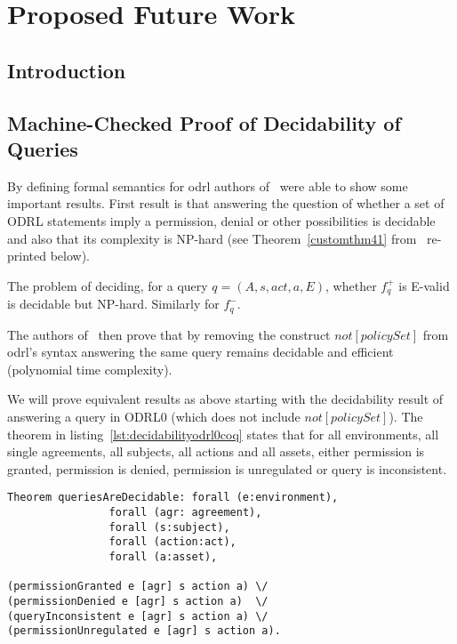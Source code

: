 \chapter{Proposed Future Work}

\section{Introduction}


\section{Machine-Checked Proof of Decidability of Queries}

By defining formal semantics for \ac{odrl} authors of~\cite{pucella2006} were able to show some important results. First result is that answering the question of whether a set of ODRL statements imply a permission, denial or other possibilities is decidable and also that its complexity is NP-hard (see Theorem~\ref{customthm41} from~\cite{pucella2006} re-printed below).

\begin{customthm}{4.1}\label{customthm41}
The problem of deciding, for a query $q = (A, s, act, a, E)$, whether $f^{+}_q$ is E-valid is decidable but NP-hard. Similarly for $f^{-}_q$.
\end{customthm}

The authors of~\cite{pucella2006} then prove that by removing the construct $not[policySet]$ from \ac{odrl}'s syntax answering the same query remains decidable and efficient (polynomial time complexity). 

We will prove equivalent results as above starting with the decidability result of answering a query in ODRL0 (which does not include $not[policySet]$). The theorem in listing~\ref{lst:decidabilityodrl0coq} states that for all environments, all single agreements, all subjects, all actions and all assets, either permission is granted, permission is denied, permission is unregulated or query is inconsistent. 

\begin{minipage}[c]{0.95\textwidth}
\begin{lstlisting}
Theorem queriesAreDecidable: forall (e:environment), 
                forall (agr: agreement),
                forall (s:subject),
                forall (action:act),
                forall (a:asset),

(permissionGranted e [agr] s action a) \/
(permissionDenied e [agr] s action a)  \/
(queryInconsistent e [agr] s action a) \/
(permissionUnregulated e [agr] s action a).

\end{lstlisting}
\end{minipage}

